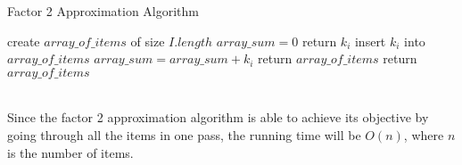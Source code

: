 \documentclass[paper=a4, fontsize=11pt]{scrartcl} %
\numberwithin{equation}{section} %
\numberwithin{figure}{section} %
\numberwithin{table}{section} %
\begin{document}
\begin{enumerate}
\begin{minipage}{\linewidth}
  \begin{algorithm}[H]
    \caption{Factor 2 Approximation Algorithm}\label{Fac2ApproxAlg}
    \begin{algorithmic}[1]
        \State create $array\_of\_items$ of size $I.length$
        \State $array\_sum = 0$
		  \State return $k_i$
		  \State insert $k_i$ into $array\_of\_items$
		  \State $array\_sum = array\_sum + k_i$
		    \State return $array\_of\_items$
		  \EndIf
		\EndIf 
	\EndFor
	\State return $array\_of\_items$
      \EndProcedure
    \end{algorithmic}
  \end{algorithm}
\end{minipage}\\

Since the factor 2 approximation algorithm is able to achieve its objective by going through all the items in one pass, the running time will be $O(n)$, where $n$ is the number of items.

\end{enumerate}

\end{document}
